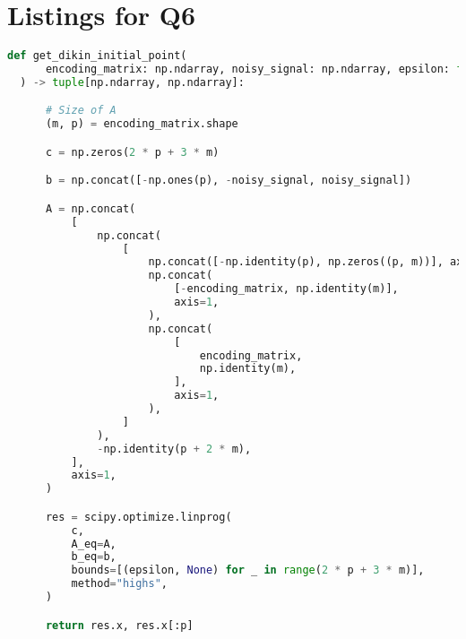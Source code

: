 \documentclass{article}
\begin{document}
\section{Listings for Q6}

\begin{minipage}{\linewidth}
  \begin{lstlisting}[language=Python, caption={Extraction of dirty initial point for Dikin's method using standard form of linear optimization problem}, label={lst:dikin_init}]
  def get_dikin_initial_point(
      encoding_matrix: np.ndarray, noisy_signal: np.ndarray, epsilon: float
  ) -> tuple[np.ndarray, np.ndarray]:

      # Size of A
      (m, p) = encoding_matrix.shape

      c = np.zeros(2 * p + 3 * m)

      b = np.concat([-np.ones(p), -noisy_signal, noisy_signal])

      A = np.concat(
          [
              np.concat(
                  [
                      np.concat([-np.identity(p), np.zeros((p, m))], axis=1),
                      np.concat(
                          [-encoding_matrix, np.identity(m)],
                          axis=1,
                      ),
                      np.concat(
                          [
                              encoding_matrix,
                              np.identity(m),
                          ],
                          axis=1,
                      ),
                  ]
              ),
              -np.identity(p + 2 * m),
          ],
          axis=1,
      )

      res = scipy.optimize.linprog(
          c,
          A_eq=A,
          b_eq=b,
          bounds=[(epsilon, None) for _ in range(2 * p + 3 * m)],
          method="highs",
      )

      return res.x, res.x[:p]
\end{lstlisting}
\end{minipage}
\end{document}
